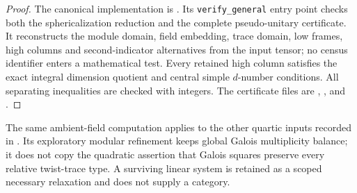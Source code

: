 \begin{proof}
The canonical implementation is
. Its
\texttt{verify\_general} entry point checks both the sphericalization
reduction and the complete pseudo-unitary certificate. It reconstructs
the module domain, field embedding, trace domain, low frames, high
columns and second-indicator alternatives from the input tensor; no
census identifier enters a mathematical test. Every retained high
column satisfies the exact integral dimension quotient and central
simple $d$-number conditions. All separating inequalities are checked
with integers. The certificate files are
,
,
 and
.
\end{proof}

The same ambient-field computation applies to the other quartic inputs
recorded in . Its exploratory
modular refinement keeps global Galois multiplicity balance; it does
not copy the quadratic assertion that Galois squares preserve every
relative twist-trace type. A surviving linear system is retained as a
scoped necessary relaxation and does not supply a category.
